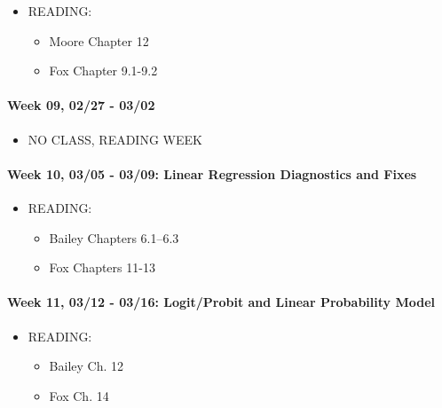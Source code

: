 \documentclass[11pt,]{article}
\providecommand{\tightlist}{%
  \setlength{\itemsep}{0pt}\setlength{\parskip}{0pt}}
\begin{document}
\begin{itemize}
\tightlist
\item
  READING:

  \begin{itemize}
  \tightlist
  \item
    Moore Chapter 12
  \item
    Fox Chapter 9.1-9.2
  \end{itemize}
\end{itemize}

\paragraph{Week 09, 02/27 - 03/02}\label{week-09-0227---0302}

\begin{itemize}
\tightlist
\item
  NO CLASS, READING WEEK
\end{itemize}

\paragraph{Week 10, 03/05 - 03/09: Linear Regression Diagnostics and
Fixes}\label{week-10-0305---0309-linear-regression-diagnostics-and-fixes}

\begin{itemize}
\tightlist
\item
  READING:

  \begin{itemize}
  \tightlist
  \item
    Bailey Chapters 6.1--6.3
  \item
    Fox Chapters 11-13
  \end{itemize}
\end{itemize}

\paragraph{Week 11, 03/12 - 03/16: Logit/Probit and Linear Probability
Model}\label{week-11-0312---0316-logitprobit-and-linear-probability-model}

\begin{itemize}
\tightlist
\item
  READING:

  \begin{itemize}
  \tightlist
  \item
    Bailey Ch. 12
  \item
    Fox Ch. 14
  \end{itemize}
\end{itemize}
\end{document}

